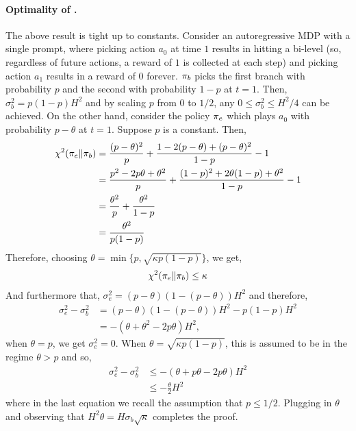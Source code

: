 \paragraph{Optimality of .} The above result is tight up to constants. Consider an autoregressive MDP with a single prompt, where picking action $a_0$ at time $1$ results in hitting a bi-level (so, regardless of future actions, a reward of $1$ is collected at each step) and picking action $a_1$ results in a reward of $0$ forever. $\pi_b$ picks the first branch with probability $p$ and the second with probability $1-p$ at $t=1$. Then, $\sigma_b^2 = p (1-p) H^2$ and by scaling $p$ from $0$ to $1/2$, any $0 \le \sigma_b^2 \le H^2/4$ can be achieved. On the other hand, consider the policy $\pi_e$ which plays $a_0$ with probability $p - \theta$ at $t=1$. Suppose $p$ is a constant. Then,
\begin{align*}
    \chi^2 (\pi_e \| \pi_b) &= \frac{(p - \theta)^2}{p} + \frac{1 - 2 (p - \theta) + (p-\theta)^2}{1-p} - 1 \\
    &= \frac{p^2 - 2p \theta + \theta^2}{p} + \frac{(1 - p)^2 + 2\theta(1-p) + \theta^2}{1-p} - 1 \\
    &= \frac{\theta^2}{p} + \frac{\theta^2}{1-p} \\
    &= \frac{\theta^2}{p(1-p)}
\end{align*}
Therefore, choosing $\theta = \min \{ p, \sqrt{\kappa p (1-p)} \}$, we get,
\begin{align*}
    \chi^2 (\pi_e \| \pi_b) \le \kappa
\end{align*}
And furthermore that, $\sigma_e^2 = (p-\theta) (1 - (p-\theta))H^2$ and therefore,
\begin{align*}
    \sigma_e^2 - \sigma_b^2 &= (p-\theta) (1 - (p-\theta))H^2 - p(1 - p)H^2 \\
    &= - (\theta + \theta^2 - 2p \theta) H^2,
\end{align*}
when $\theta = p$, we get $\sigma_e^2 = 0$. When $\theta = \sqrt{\kappa p (1-p)}$, this is assumed to be in the regime $\theta > p$ and so,
\begin{align*}
    \sigma_e^2 - \sigma_b^2 &\le - (\theta + p \theta - 2 p \theta) H^2 \\
    &\le - \frac{\theta}{2} H^2
\end{align*}
where in the last equation we recall the assumption that $p \le 1/2$. Plugging in $\theta$ and observing that $H^2 \theta = H \sigma_b \sqrt{\kappa}$ completes the proof.


